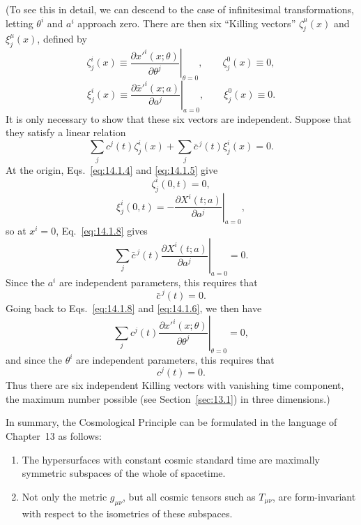 (To see this in detail, we can descend to the case of infinitesimal
transformations, letting \(\theta^i\) and \(a^i\) approach zero. There are then
six ``Killing vectors'' \(\zeta_j^\mu(x)\) and \(\xi_j^\mu(x)\), defined by
\begin{equation}
  \zeta_j^i(x)
  \equiv
  \left.
  \frac{\partial x'^i(x;\theta)}{\partial\theta^j}
  \right|_{\theta=0},
  \qquad
  \zeta_j^0(x)\equiv0,
  \tag{14.1.6}\label{eq:14.1.6}
\end{equation}
\begin{equation}
  \xi_j^i(x)
  \equiv
  \left.
  \frac{\partial\bar x'^i(x;a)}{\partial a^j}
  \right|_{a=0},
  \qquad
  \xi_j^0(x)\equiv0.
  \tag{14.1.7}\label{eq:14.1.7}
\end{equation}
It is only necessary to show that these six vectors are independent. Suppose
that they satisfy a linear relation
\begin{equation}
  \sum_j c^j(t)\zeta_j^i(x)
  +\sum_j\bar c^{\,j}(t)\xi_j^i(x)=0.
  \tag{14.1.8}\label{eq:14.1.8}
\end{equation}
At the origin, Eqs.~\eqref{eq:14.1.4} and \eqref{eq:14.1.5} give
\begin{equation}
  \zeta_j^i(0,t)=0,
  \tag{14.1.9}\label{eq:14.1.9}
\end{equation}
\begin{equation}
  \xi_j^i(0,t)
  =
  -\left.
  \frac{\partial X^i(t;a)}{\partial a^j}
  \right|_{a=0},
  \tag{14.1.10}\label{eq:14.1.10}
\end{equation}
so at \(x^i=0\), Eq.~\eqref{eq:14.1.8} gives
\[
  \left.
  \sum_j\bar c^{\,j}(t)\frac{\partial X^i(t;a)}{\partial a^j}
  \right|_{a=0}=0.
\]
Since the \(a^i\) are independent parameters, this requires that
\begin{equation}
  \bar c^{\,j}(t)=0.
  \tag{14.1.11}\label{eq:14.1.11}
\end{equation}
Going back to Eqs.~\eqref{eq:14.1.8} and \eqref{eq:14.1.6}, we then have
\[
  \left.
  \sum_j c^j(t)
  \frac{\partial x'^i(x;\theta)}{\partial\theta^j}
  \right|_{\theta=0}=0,
\]
and since the \(\theta^i\) are independent parameters, this requires that
\begin{equation}
  c^j(t)=0.
  \tag{14.1.12}\label{eq:14.1.12}
\end{equation}
Thus there are six independent Killing vectors with vanishing time component,
the maximum number possible (see Section~\ref{sec:13.1}) in three
dimensions.)

In summary, the Cosmological Principle can be formulated in the language of
Chapter~13 as follows:

\begin{enumerate}
\item[(i)] The hypersurfaces with constant cosmic standard time are maximally
  symmetric subspaces of the whole of spacetime.

\item[(ii)] Not only the metric \(g_{\mu\nu}\), but all cosmic tensors such as
  \(T_{\mu\nu}\), are form-invariant with respect to the isometries of these
  subspaces.
\end{enumerate}
